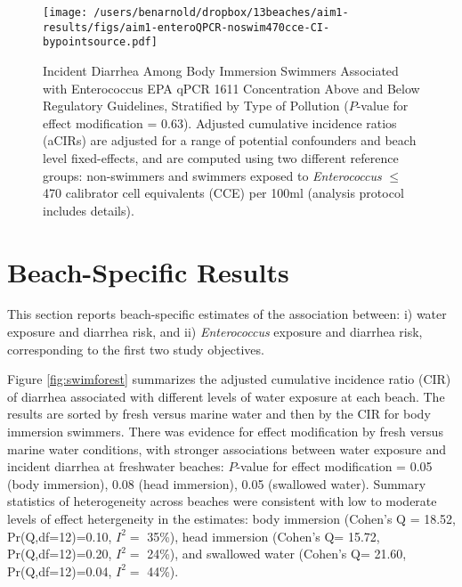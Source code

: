\documentclass[12pt]{article}\usepackage[]{graphicx}\usepackage[]{color}
\begin{document}
\begin{landscape}
\begin{figure}
\begin{center}
\texttt{[image: /users/benarnold/dropbox/13beaches/aim1-results/figs/aim1-enteroQPCR-noswim470cce-CI-bypointsource.pdf]}
\caption{Incident Diarrhea Among Body Immersion Swimmers Associated with Enterococcus EPA qPCR 1611 Concentration Above and Below Regulatory Guidelines, Stratified by Type of Pollution ($P$-value for effect modification = 0.63). Adjusted cumulative incidence ratios (aCIRs) are adjusted for a range of potential confounders and beach level fixed-effects, and are computed using two different reference groups: non-swimmers and swimmers exposed to \textit{Enterococcus} $\leq$470 calibrator cell equivalents (CCE) per 100ml (analysis protocol includes details). \label{fig:regulationQPCR}}
\end{center}
\end{figure}
\end{landscape}

\clearpage
\section{Beach-Specific Results}



This section reports beach-specific estimates of the association between: i) water exposure and diarrhea risk, and ii) \emph{Enterococcus} exposure and diarrhea risk, corresponding to the first two study objectives.

Figure \ref{fig:swimforest} summarizes the adjusted cumulative incidence ratio (CIR) of diarrhea associated with different levels of water exposure at each beach.  The results are sorted by fresh versus marine water and then by the CIR for body immersion swimmers. There was evidence for effect modification by fresh versus marine water conditions, with stronger associations between water exposure and incident diarrhea at freshwater beaches: $P$-value for effect modification = 0.05 (body immersion), 0.08 (head immersion), 0.05 (swallowed water). Summary statistics of heterogeneity across beaches\supercite{Higgins2002-vr, Higgins2003-bh} were consistent with low to moderate levels of effect hetergeneity in the estimates: body immersion (Cohen's Q =
18.52, 
Pr(Q,df=12)=0.10,
$I^2=$ 35\%),
 head immersion (Cohen's Q=
 15.72, 
Pr(Q,df=12)=0.20,
$I^2=$ 24\%),
 and swallowed water (Cohen's Q=
 21.60, 
Pr(Q,df=12)=0.04,
$I^2=$ 44\%).
\end{document}
